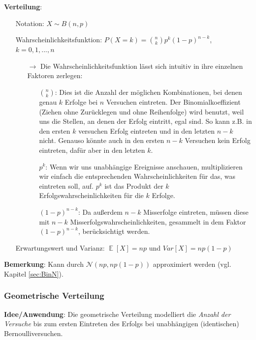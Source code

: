 \documentclass[a4paper]{article}
\DeclareMathOperator*{\E}{\mathbb{E}}
\begin{document}
\noindent \textbf{Verteilung}:
\begin{itemize}
\item[] Notation: $X\sim B(n,p)$
\item[] Wahrscheinlichkeitsfunktion: $P(X=k)=\binom{n}{k}p^k(1-p)^{n-k}$, $k=0,1,...,n$
	\begin{itemize}
	\item[$\rightarrow$] Die Wahrscheinlichkeitsfunktion lässt sich intuitiv in ihre einzelnen Faktoren zerlegen:
		\begin{itemize}
		\item[] $\binom{n}{k}$: Dies ist die Anzahl der möglichen Kombinationen, bei denen genau $k$ Erfolge bei $n$ Versuchen eintreten. Der Binomialkoeffizient (Ziehen ohne Zurücklegen und ohne Reihenfolge) wird benutzt, weil uns die Stellen, an denen der Erfolg eintritt, egal sind. So kann z.B. in den ersten $k$ versuchen Erfolg eintreten und in den letzten $n-k$ nicht. Genauso könnte auch in den ersten $n-k$ Versuchen kein Erfolg eintreten, dafür aber in den letzten $k$.
		\item[] $p^k$: Wenn wir uns unabhängige Ereignisse anschauen, multiplizieren wir einfach die entsprechenden Wahrscheinlichkeiten für das, was eintreten soll, auf. $p^k$ ist das Produkt der $k$ Erfolgswahrscheinlichkeiten für die $k$ Erfolge.
		\item[] $(1-p)^{n-k}$: Da außerdem $n-k$ Misserfolge eintreten, müssen diese mit $n-k$ Misserfolgswahrscheinlichkeiten, gesammelt in dem Faktor $(1-p)^{n-k}$, berücksichtigt werden.
		\end{itemize}
	\end{itemize}
\item[] Erwartungswert und Varianz: $\E[X]=np$ und $Var[X]=np(1-p)$

\end{itemize}

\noindent \textbf{Bemerkung}: Kann durch $\mathcal{N}(np,np(1-p))$ approximiert werden (vgl. Kapitel \ref{sec:BinN}).

\subsubsection{Geometrische Verteilung} \label{sec:Geo}

\noindent \textbf{Idee/Anwendung}: Die geometrische Verteilung modelliert die \textit{Anzahl der Versuche} bis zum ersten Eintreten des Erfolgs bei unabhängigen (identischen) Bernoulliversuchen. \\
\end{document}
